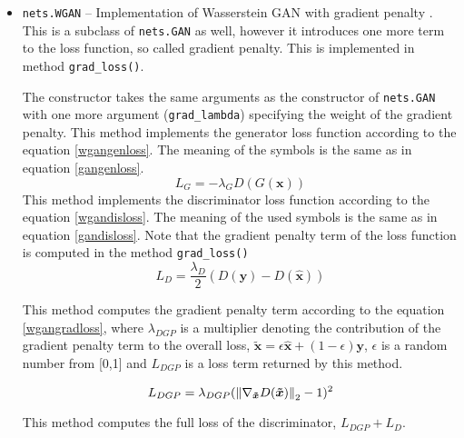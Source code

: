 \begin{itemize}
\begin{description}
\end{description}
\item \texttt{nets.WGAN} -- Implementation of Wasserstein GAN with gradient penalty \cite{wgan}. This is a subclass of \texttt{nets.GAN} as well, however it introduces one more term to the loss function, so called gradient penalty. This is implemented in method \texttt{grad\_loss()}.
\begin{description}
 The constructor takes the same arguments as the constructor of \texttt{nets.GAN} with one more argument (\texttt{grad\_lambda}) specifying the weight of the gradient penalty.
 This method implements the generator loss function according to the equation \ref{wgangenloss}. The meaning of the symbols is the same as in equation \ref{gangenloss}.
\begin{equation}
L_G = -\lambda_GD(G(\bm{x}))
\label{wgangenloss}
\end{equation}
 This method implements the discriminator loss function according to the equation \ref{wgandisloss}. The meaning of the used symbols is the same as in equation \ref{gandisloss}. Note that the gradient penalty term of the loss function is computed in the method \texttt{grad\_loss()}
\begin{equation}
L_D = \frac{\lambda_D}{2}(D(\bm{y}) - D(\bm{\hat{x}}))
\label{wgandisloss}
\end{equation}

 This method computes the gradient penalty term according to the equation \ref{wgangradloss}, where $\lambda_{DGP}$ is a multiplier denoting the contribution of the gradient penalty term to the overall loss, $\bm{\tilde{x}} = \epsilon\bm{\hat{x}} + (1-\epsilon)\bm{y}$, $\epsilon$ is a random number from [0,1] and $L_{DGP}$ is a loss term returned by this method.

\begin{equation}
L_{DGP} = \lambda_{DGP}(\left\lVert\nabla_{\bm{\tilde{x}}}D(\bm{\tilde{x}})\right\rVert_2 - 1)^2
\label{wgangradloss}
\end{equation}

 This method computes the full loss of the discriminator, $L_{DGP} + L_D$.
\end{description}
\end{itemize}

